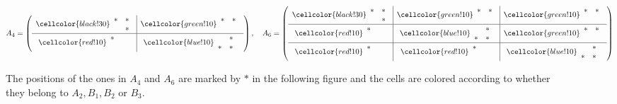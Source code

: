 \begin{figure}
$$ A_4 = \left(\begin{array}{c|c}
\cellcolor{black!30}\begin{array}{cc} * & * \\  & * \end{array}&\cellcolor{green!10} \begin{array}{cc} * & * \\  &  \end{array}\\
\hline
\cellcolor{red!10}\begin{array}{cc} * & \;\text{ }  \\  &  \end{array}& \cellcolor{blue!10}\begin{array}{cc}  & * \\ * & * \end{array}
 \end{array}\right),
 \quad 
 A_6 = \left(\begin{array}{c|c|c} 
 \cellcolor{black!30} \begin{array}{cc} * & * \\ & * \end{array}& \cellcolor{green!10}\begin{array}{cc} * & * \\  &  \end{array} & \cellcolor{green!10} \begin{array}{cc} * & * \\  &  \end{array} \\
 \hline
\cellcolor{red!10}\begin{array}{cc} * & \;\text{ }  \\  &  \end{array} & \cellcolor{blue!10}  \begin{array}{cc}  & * \\ * & * \end{array} &  \cellcolor{green!10}\begin{array}{cc} * & * \\  &  \end{array}  \\
\hline
\cellcolor{red!10}\begin{array}{cc} * & \;\text{ } \\  &  \end{array}& \cellcolor{red!10}\begin{array}{cc} * & \;\text{ } \\  &  \end{array} &  \cellcolor{blue!10}\begin{array}{cc}  & * \\ * & * \end{array} \\
\end{array}\right)
  $$
\caption{The positions of the ones in $A_4$ and $A_6$ are marked by $*$ in the following figure and the cells are colored according to whether they belong to $A_2, B_1, B_2$ or $B_3$.}\label{fig:qubit-matrices}
\end{figure}


